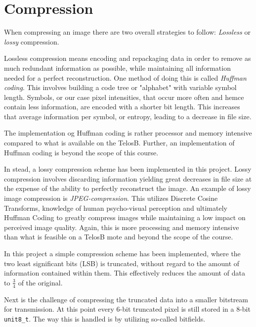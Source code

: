 \section{Compression}
When compressing an image there are two overall strategies to follow:
\emph{Lossless} or \emph{lossy} compression.

Lossless compression means encoding and repackaging data in order to remove as much redundant information as possible, while maintaining all information needed for a perfect reconstruction. 
One method of doing this is called \emph{Huffman coding}.
This involves building a code tree or "alphabet" with variable symbol length.
Symbols, or our case pixel intensities, that occur more often and hemce contain less information, are encoded with a shorter bit length. 
This increases that average information per symbol, or entropy, leading to a decrease in file size.

The implementation og Huffman coding is rather processor and memory intensive compared to what is available on the TelosB.
Further, an implementation of Huffman coding is beyond the scope of this course.

In stead, a lossy compression scheme has been implemented in this project.
Lossy compression involves discarding information yielding great decreases in file size at the expense of the ability to perfectly reconstruct the image.
An example of lossy image compression is \emph{JPEG-compression}.
This utilizes Discrete Cosine Transforms, knowledge of human psycho-visual perception and ultimately Huffman Coding to greatly compress images while maintaining a low impact on perceived image quality.
Again, this is more processing and memory intensive than what is feasible on a TelosB mote and beyond the scope of the course.

In this project a simple compression scheme has been implemented, where the two least significant  bits (LSB) is truncated, without regard to the amount of information contained within them.
This effectively reduces the amount of data to $ \frac{3}{4} $ of the original. 

Next is the challenge of compressing the truncated data into a smaller bitstream for transmission.
At this point every 6-bit truncated pixel is still stored in a 8-bit \texttt{unit8\_t}.
The way this is handled is by utilizing so-called bitfields.


